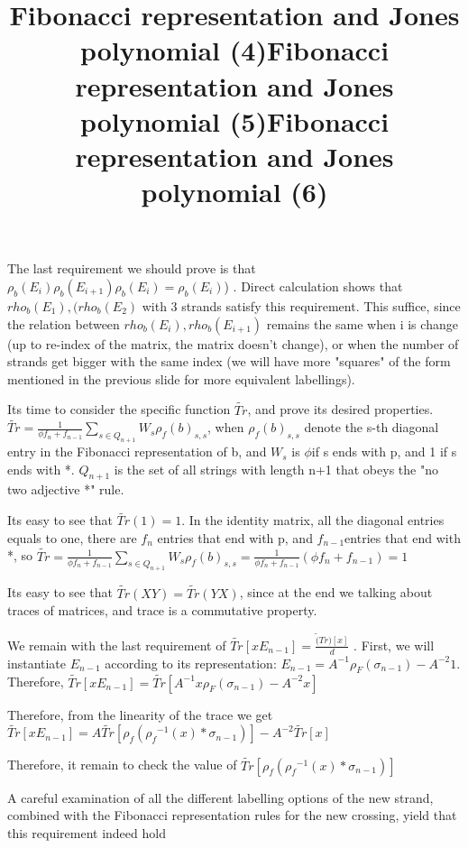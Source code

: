 \documentclass{article}
\begin{document}
\title{Fibonacci representation and Jones polynomial (4)}
The last requirement we should prove is that  
 $\rho_{b}(E_{i})\rho_{b}(E_{i+1})\rho_{b}(E_{i}) = \rho_{b}(E_{i})$)
 . Direct calculation shows that $rho_{b}(E_{1}), (rho_{b}(E_{2})$ with 3 strands satisfy this requirement. This suffice, since the relation between $rho_{b}(E_{i}), rho_{b}(E_{i+1})$ remains the same when i is change (up to re-index of the matrix, the matrix doesn't change), or when the number of strands get bigger with the same index (we will have more "squares" of the form mentioned in the previous slide for more equivalent labellings).


\title{Fibonacci representation and Jones polynomial (5)}
Its time to consider the specific function $\tilde{Tr}$, and prove its desired properties.
$\tilde{Tr} = \frac{1}{{\phi}f_{n}+f_{n-1}}\sum\limits_{s \in Q_{n+1}}{W_{s}}\rho_{f}(b)_{s,s}$,
when $\rho_{f}(b)_{s,s}$ denote the s-th diagonal entry in the Fibonacci representation of b,
and $W_{s}$ is $\phi$if s ends with p, and 1 if s ends with *. $Q_{n+1}$ is the set of all strings with length n+1 that obeys the "no two adjective *" rule. 

Its easy to see that $\tilde{Tr}(1) = 1$. In the identity matrix, all the diagonal entries equals to one, there are $f_{n}$ entries that end with p, and $f_{n-1}$entries that end with *, so 
$\tilde{Tr} = \frac{1}{{\phi}f_{n}+f_{n-1}}\sum\limits_{s \in Q_{n+1}}{W_{s}}\rho_{f}(b)_{s,s} =
 \frac{1}{{\phi}f_{n}+f_{n-1}} ({\phi}f_{n}+f_{n-1}) = 1$


\title{Fibonacci representation and Jones polynomial (6)}
Its easy to see that $\tilde{Tr}(XY) = \tilde{Tr}(YX)$, since at the end we talking about traces of matrices, and trace is a commutative property.

We remain with the last requirement of  $ \tilde{Tr}[xE_{n-1}]=\frac{\tilde(Tr)[x]}{d}$ . First, we will instantiate $E_{n-1}$ according to its representation: $E_{n-1} = A^{-1}\rho_{F}(\sigma_{n-1}) - A^{-2}1$. Therefore, $ \tilde{Tr}[xE_{n-1}] = \tilde{Tr}[A^{-1}x\rho_{F}(\sigma_{n-1}) - A^{-2}x]$

Therefore, from the linearity of the trace we get  $ \tilde{Tr}[xE_{n-1}] = A\tilde{Tr}[{\rho_{f}({\rho_{f}}^{-1}(x) * \sigma_{n-1})}] -A^{-2}\tilde{Tr}[x]$

Therefore, it remain to check  the value of $\tilde{Tr}[{\rho_{f}({\rho_{f}}^{-1}(x) * \sigma_{n-1})}]$

A careful examination of all the different labelling options of the new strand, combined with the Fibonacci representation rules for the new crossing, yield that this requirement indeed hold
\end{document}
